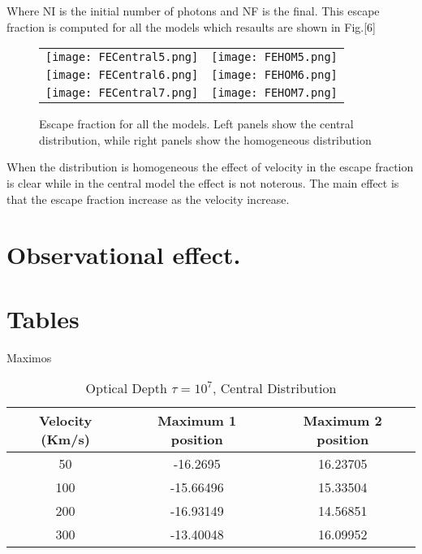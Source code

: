 \documentclass{article}
\theoremstyle{definition}
\theoremstyle{remark}
\begin{document}
Where NI is the initial number of photons and NF is the final. This escape fraction is computed for all the models which resaults are shown in Fig.[6]\\
 
\begin{figure}[H]

  \centering

  \label{figur}\caption{Escape fraction for all the models. Left panels show the central distribution, while right panels show the homogeneous distribution}

  \begin{tabular}{cc}

    
    \texttt{[image: FECentral5.png]}&

    \texttt{[image: FEHOM5.png]}\\

    \texttt{[image: FECentral6.png]}&

    \texttt{[image: FEHOM6.png]}\\

    \texttt{[image: FECentral7.png]}&

    \texttt{[image: FEHOM7.png]}\\

  \end{tabular}

\end{figure}

When the distribution is homogeneous the effect of velocity in the escape fraction is clear while in the central model the effect is not noterous.
The main effect is that the escape fraction increase as the velocity increase. 

\section*{Observational effect.}


\section*{Tables}

Maximos\\

\begin{table}[H]
\begin{center}
\begin{tabular}{|c|c|c|}
\hline          
Velocity (Km/s) & Maximum 1 position & Maximum 2 position \\ 
\hline 
50 & -16.2695 & 16.23705 \\ 
\hline 
100 & -15.66496 & 15.33504 \\ 
\hline 
200 & -16.93149 & 14.56851 \\ 
\hline 
300 & -13.40048 & 16.09952 \\ 
\hline 
\end{tabular} 
\caption{Optical Depth $\tau= 10^{7}$, Central Distribution}
\end{center}
\end{table}
\end{document}
